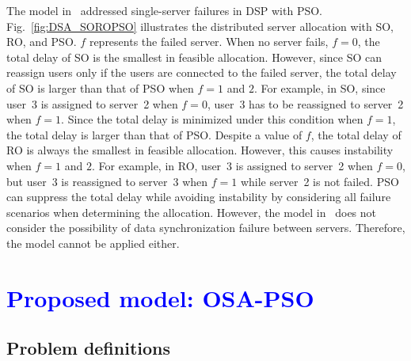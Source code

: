 \documentclass[10pt, letterpaper]{IEEEtran}
\newcommand\blue[1]{\textcolor{blue}{#1}}
\begin{document}
\begin{CJK}{UTF8}{ipxm}
The model in~\cite{5_9_Masuda2020} addressed single-server failures in DSP with PSO.
Fig.~\ref{fig:DSA_SOROPSO} illustrates the distributed server allocation with SO, RO, and PSO.
$f$ represents the failed server.
When no server fails, $f = 0$, the total delay of SO is the smallest in feasible allocation.
However, since SO can reassign users only if the users are connected to the failed server, the total delay of SO is larger than that of PSO when $f = 1$ and $2$.
For example, in SO, since user~3 is assigned to server~2 when $f = 0$, user~3 has to be reassigned to server~2 when $f = 1$.
Since the total delay is minimized under this condition when $f = 1$, the total delay is larger than that of PSO.
Despite a value of $f$, the total delay of RO is always the smallest in feasible allocation.
However, this causes instability when $f = 1$ and $2$.
For example, in RO, user~3 is assigned to server~2 when $f = 0$, but user~3 is reassigned to server~3 when $f = 1$ while server~2 is not failed.
PSO can suppress the total delay while avoiding instability by considering all failure scenarios when determining the allocation.
However, the model in~\cite{5_9_Masuda2020} does not consider the possibility of data synchronization failure between servers.
Therefore, the model cannot be applied either.

\section{\blue{Proposed model: OSA-PSO}}
\label{sec:proposed_mode_cmnd_pso}

\subsection{Problem definitions}


\end{CJK}
\end{document}
